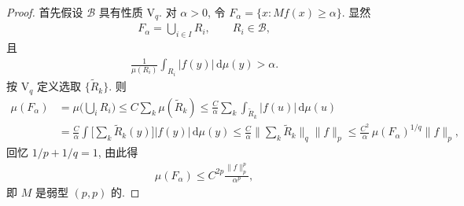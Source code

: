 \begin{proof}
首先假设 $\mathcal{B}$ 具有性质 $\mathrm{V}_q$. 对 $\alpha > 0$, 令 $F_\alpha = \{x : M f(x) \geq \alpha\}$. 显然
\begin{align*}
  F_{\alpha}=\bigcup_{i\in I}R_{i},\qquad R_{i}\in\mathcal{B},
\end{align*}
且
\begin{align*}
  \frac{1}{\mu(R_{i})}\int_{R_{i}}\left|f(y)\right|\,\mathrm{d}\mu(y)>\alpha.
\end{align*}
按 $\mathrm{V}_q$ 定义选取 $\{\tilde{R}_k\}$. 则
\begin{align*}
  \mu(F_{\alpha})
  &=\mu\Big(\bigcup_{i} R_{i}\Big)\leq C\sum_{k}\mu(\tilde{R}_{k})
  \leq\frac{C}{\alpha}\sum_{k}\int_{\tilde{R}_{k}}|f(u)|\,\mathrm{d}\mu(u)\\
  &=\frac{C}{\alpha}\int\Big[\sum_{k}\tilde{R}_{k}(y)\Big]|f(y)|\,\mathrm{d}\mu(y)
  \leq\frac{C}{\alpha}\Big\|\sum_{k}\tilde{R}_{k}\Big\|_{q}\|f\|_{p}
  \leq\frac{C^{2}}{\alpha}\,\mu(F_{\alpha})^{1/q}\|f\|_{p},
\end{align*}
回忆 $1/p + 1/q = 1$, 由此得
\begin{align*}
  \mu(F_{\alpha})\leq C^{2p}\frac{\|f\|_{p}^{p}}{\alpha^{p}},
\end{align*}
即 $M$ 是弱型 $(p, p)$ 的.


\end{proof}
